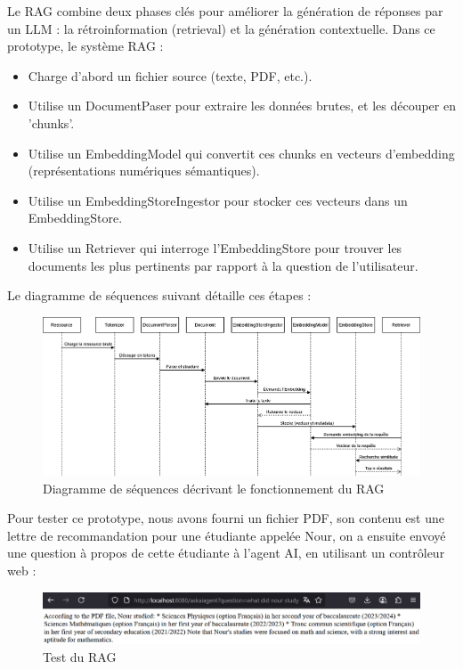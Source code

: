 \documentclass[12pt,a4paper]{report}
\begin{document}
	Le RAG combine deux phases clés pour améliorer la génération de réponses par un LLM : la rétroinformation (retrieval) et la génération contextuelle. Dans ce prototype, le système RAG :
	
	\begin{itemize}
		\item Charge d’abord un fichier source (texte, PDF, etc.).
		\item Utilise un DocumentPaser pour extraire les données brutes, et les découper en 'chunks'.
		\item Utilise un EmbeddingModel qui convertit ces chunks en vecteurs d’embedding (représentations numériques sémantiques).
		\item Utilise un EmbeddingStoreIngestor pour stocker ces vecteurs dans un EmbeddingStore.
		\item Utilise un Retriever qui interroge l’EmbeddingStore pour trouver les documents les plus pertinents par rapport à la question de l'utilisateur.
	\end{itemize}
	
	Le diagramme de séquences suivant détaille ces étapes :
	
	\begin{figure}[H]
		\centering
		\includegraphics[width=\textwidth]{ds-rag.drawio.png}
		\caption{Diagramme de séquences décrivant le fonctionnement du RAG}
		\label{fig:ds-rag.drawio}
	\end{figure}
	
	Pour tester ce prototype, nous avons fourni un fichier PDF, son contenu est une lettre de recommandation pour une étudiante appelée Nour, on a ensuite envoyé une question à propos de cette étudiante à l'agent AI, en utilisant un contrôleur web :
	
	\begin{figure}[H]
		\centering
		\includegraphics[width=\textwidth]{test-rag.png}
		\caption{Test du RAG}
		\label{fig:test-rag}
	\end{figure}
	
	
	
\end{document}
